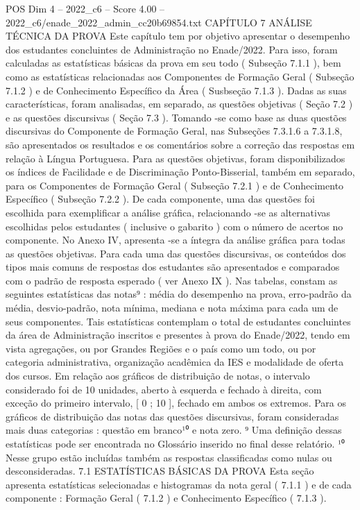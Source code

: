 \begin{textsample}{POS Dim 4 – 2022\_c6 – Score 4.00 – 2022\_c6/enade\_2022\_admin\_cc20b69854.txt}  \label{ex:f4_pos_083}
CAPÍTULO 7 ANÁLISE TÉCNICA DA PROVA Este capítulo tem por objetivo apresentar o desempenho dos estudantes concluintes de Administração no Enade/2022.
Para isso, foram calculadas as estatísticas básicas da prova em seu todo ( Subseção 7.1.1 ), bem como as estatísticas relacionadas aos Componentes de Formação Geral ( Subseção 7.1.2 ) e de Conhecimento Específico da Área ( Susbseção 7.1.3 ).
Dadas as suas características, foram analisadas, em separado, as questões objetivas ( Seção 7.2 ) e as questões discursivas ( Seção 7.3 ).
Tomando -se como base as duas questões discursivas do Componente de Formação Geral, nas Subseções 7.3.1.6 a 7.3.1.8, são apresentados os resultados e os comentários sobre a correção das respostas em relação à Língua Portuguesa.
Para as questões objetivas, foram disponibilizados os índices de Facilidade e de Discriminação Ponto-Bisserial, também em separado, para os Componentes de Formação Geral ( Subseção 7.2.1 ) e de Conhecimento Específico ( Subseção 7.2.2 ).
De cada componente, uma das questões foi escolhida para exemplificar a análise gráfica, relacionando -se as alternativas escolhidas pelos estudantes ( inclusive o gabarito ) com o número de acertos no componente.
No Anexo IV, apresenta -se a íntegra da análise gráfica para todas as questões objetivas.
Para cada uma das questões discursivas, os conteúdos dos tipos mais comuns de respostas dos estudantes são apresentados e comparados com o padrão de resposta esperado ( ver Anexo IX ).
Nas tabelas, constam as seguintes estatísticas das notas⁹ : média do desempenho na prova, erro-padrão da média, desvio-padrão, nota mínima, mediana e nota máxima para cada um de seus componentes.
Tais estatísticas contemplam o total de estudantes concluintes da área de Administração inscritos e presentes à prova do Enade/2022, tendo em vista agregações, ou por Grandes Regiões e o país como um todo, ou por categoria administrativa, organização acadêmica da IES e modalidade de oferta dos cursos.
Em relação aos gráficos de distribuição de notas, o intervalo considerado foi de 10 unidades, aberto à esquerda e fechado à direita, com exceção do primeiro intervalo, [ 0 ; 10 ], fechado em ambos os extremos.
Para os gráficos de distribuição das notas das questões discursivas, foram consideradas mais duas categorias : questão em branco¹⁰ e nota zero. ⁹ Uma definição dessas estatísticas pode ser encontrada no Glossário inserido no final desse relatório. ¹⁰ Nesse grupo estão incluídas também as respostas classificadas como nulas ou desconsideradas. 7.1 ESTATÍSTICAS BÁSICAS DA PROVA Esta seção apresenta estatísticas selecionadas e histogramas da nota geral ( 7.1.1 ) e de cada componente : Formação Geral ( 7.1.2 ) e Conhecimento Específico ( 7.1.3 ).

\end{textsample}
